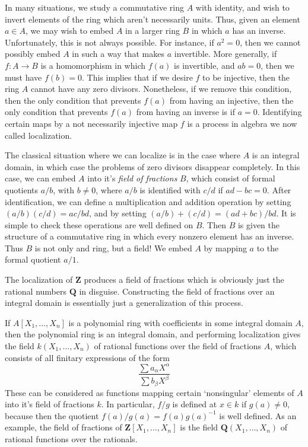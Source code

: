 In many situations, we study a commutative ring $A$ with identity, and wish to invert elements of the ring which aren't necessarily units. Thus, given an element $a \in A$, we may wish to embed $A$ in a larger ring $B$ in which $a$ has an inverse. Unfortunately, this is not always possible. For instance, if $a^2 = 0$, then we cannot possibly embed $A$ in such a way that makes $a$ invertible. More generally, if $f:A \to B$ is a homomorphism in which $f(a)$ is invertible, and $ab = 0$, then we must have $f(b) = 0$. This implies that if we desire $f$ to be injective, then the ring $A$ cannot have any zero divisors. Nonetheless, if we remove this condition, then the only condition that prevents $f(a)$ from having an injective, then the only condition that prevents $f(a)$ from having an inverse is if $a = 0$. Identifying certain maps by a not necessarily injective map $f$ is a process in algebra we now called localization.

The classical situation where we can localize is in the case where $A$ is an integral domain, in which case the problems of zero divisors disappear completely. In this case, we can embed $A$ into it's \emph{field of fractions} $B$, which consist of formal quotients $a/b$, with $b \neq 0$, where $a/b$ is identified with $c/d$ if $ad - bc = 0$. After identification, we can define a multiplication and addition operation by setting $(a/b)(c/d) = ac/bd$, and by setting $(a/b) + (c/d) = (ad + bc)/bd$. It is simple to check these operations are well defined on $B$. Then $B$ is given the structure of a commutative ring in which every nonzero element has an inverse. Thus $B$ is not only and ring, but a field! We embed $A$ by mapping $a$ to the formal quotient $a/1$.

\begin{example}
    The localization of $\mathbf{Z}$ produces a field of fractions which is obviously just the rational numbers $\mathbf{Q}$ in disguise. Constructing the field of fractions over an integral domain is essentially just a generalization of this process.
\end{example}

\begin{example}
    If $A[X_1, \dots, X_n]$ is a polynomial ring with coefficients in some integral domain $A$, then the polynomial ring is an integral domain, and performing localization gives the field $k(X_1, \dots, X_n)$ of rational functions over the field of fractions $A$, which consists of all finitary expressions of the form
    \[ \frac{\sum a_\alpha X^\alpha}{\sum b_\beta X^\beta} \]
    These can be considered as functions mapping certain `nonsingular' elements of $A$ into it's field of fractions $k$. In particular, $f/g$ is defined at $x \in k$ if $g(a) \neq 0$, because then the quotient $f(a)/g(a) = f(a) g(a)^{-1}$ is well defined. As an example, the field of fractions of $\mathbf{Z}[X_1, \dots, X_n]$ is the field $\mathbf{Q}(X_1, \dots, X_n)$ of rational functions over the rationals.
\end{example}

